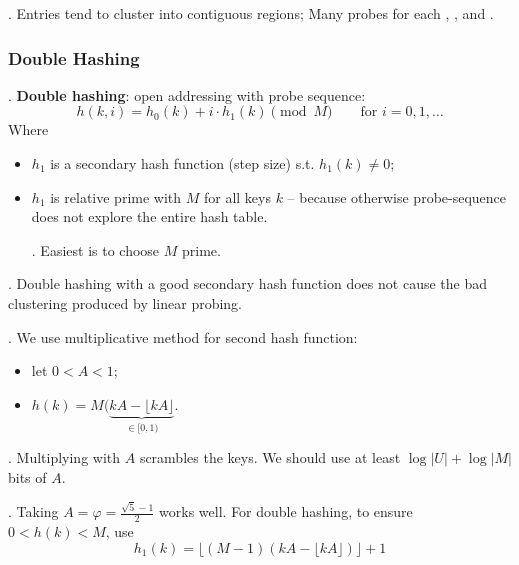 \documentclass{article}
\begin{document}
\begin{result}.
    Entries tend to cluster into contiguous regions; Many probes for each , , and . 
\end{result}

\subsubsection{Double Hashing} 

\begin{deff}.
    \textbf{Double hashing}: open addressing with probe sequence: 
    \[ h(k, i) = h_0(k) + i \cdot h_1(k) \pmod{M} \qquad \text{for } i = 0, 1, \ldots \]
    Where \begin{itemize}
        \item $h_1$ is a secondary hash function (step size) s.t. $h_1(k) \neq 0$; 
        \item $h_1$ is relative prime with $M$ for all keys $k$ -- because otherwise probe-sequence does not explore the entire hash table. 
        \begin{comm}[].
            Easiest is to choose $M$ prime. 
        \end{comm}
    \end{itemize}
\end{deff}

\begin{thmm}[].
    Double hashing with a good secondary hash function does not cause the bad clustering produced by linear probing. 
\end{thmm}

\begin{discovery}[].
    We use multiplicative method for second hash function: \begin{itemize}
        \item let $0 < A < 1$; 
        \item $h(k) = M ( \underbrace{kA - \lfloor kA \rfloor}_{\in [0, 1)}$. 
    \end{itemize}
\end{discovery}

\begin{comm}[].
    Multiplying with $A$ scrambles the keys. We should use at least $\log|U| + \log|M|$ bits of $A$. 
\end{comm}

\begin{thmm}[].
    Taking $A = \varphi = \frac{\sqrt{5} - 1}{2}$ works well. For double hashing, to ensure $0 < h(k) < M$, use 
    \[ h_1(k) = \lfloor (M - 1) (kA - \lfloor kA \rfloor) \rfloor + 1 \]
\end{thmm}
\end{document}

